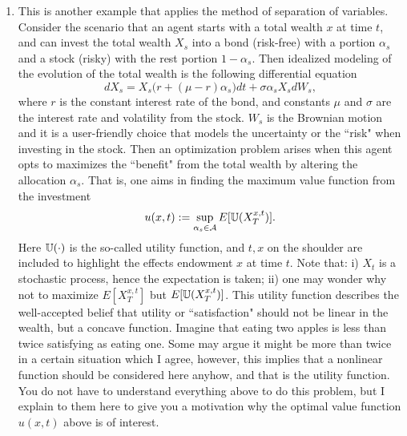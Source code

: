 \documentclass[6pt]{article}
\newtheorem{solution}{Solution}
\numberwithin{equation}{section}
\def\mathbb{\Bbb}
\begin{document}
\begin{enumerate}
\begin{solution}
(iii)-(iv).
When $D=L=h=1$ (should have assumed $h=1$), the approximate solution takes the form
\[u^N(x,t)=\sum_{k=1}^{N} \frac{8(-1)^k}{(2k-1)^2\pi^2}  \big(\cos (2k-1)\pi t\big)\big(\sin (2k-1)\pi x\big).\]

\begin{figure}
  \centering
  \texttt{[image: hw2figure5.eps]}\\
  \caption{Graphes of $u^{10}(x,t)$ at different times.  Note that all satisfy the DBC and there are certain periodicity in these solutions.}\label{figure4}
\end{figure}

\end{solution}

\item  This is another example that applies the method of separation of variables.  Consider the scenario that an agent starts with a total wealth $x$ at time $t$, and can invest the total wealth $X_s$ into a bond (risk-free) with a portion $\alpha_s$ and a stock (risky) with the rest portion $1-\alpha_s$.  Then idealized modeling of the evolution of the total wealth is the following differential equation
    \[dX_s=X_s\big(r+(\mu-r)\alpha_s\big)dt+\sigma \alpha_sX_sdW_s,\]
    where $r$ is the constant interest rate of the bond, and constants $\mu$ and $\sigma$ are the interest rate and volatility from the stock.  $W_s$ is the Brownian motion and it is a user-friendly choice that models the uncertainty or the ``risk" when investing in the stock.  Then an optimization problem arises when this agent opts to maximizes the ``benefit" from the total wealth by altering the allocation $\alpha_s$.  That is, one aims in finding the maximum value function from the investment
    \[u(x,t):=\sup_{\alpha_s\in\mathcal A}E[\mathbb U(X^{x,t}_T)].\]
    Here $\mathbb U(\cdot)$ is the so-called utility function, and ${t,x}$ on the shoulder are included to highlight the effects endowment $x$ at time $t$.  Note that: i) $X_t$ is a stochastic process, hence the expectation is taken; ii) one may wonder why not to maximize $E[X^{x,t}_T]$ but $E[\mathbb U(X^{x,t}_T)]$.  This utility function describes the well-accepted belief that utility or ``satisfaction" should not be linear in the wealth, but a concave function.  Imagine that eating two apples is less than twice satisfying as eating one.  Some may argue it might be more than twice in a certain situation which I agree, however, this implies that a nonlinear function should be considered here anyhow, and that is the utility function.  You do not have to understand everything above to do this problem, but I explain to them here to give you a motivation why the optimal value function $u(x,t)$ above is of interest.


\end{enumerate}
\end{document}
